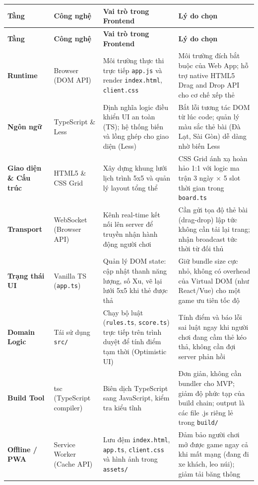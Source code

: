 \begin{longtable}{|p{2.5cm}|p{2.8cm}|p{4.5cm}|p{5.2cm}|}
\hline
\rowcolor[rgb]{0.8, 0.9, 1.0}
\textbf{Tầng} &
\textbf{Công nghệ} &
\textbf{Vai trò trong Frontend} &
\textbf{Lý do chọn}
\\
\hline
\endfirsthead

\hline
\rowcolor[rgb]{0.8, 0.9, 1.0}
\textbf{Tầng} &
\textbf{Công nghệ} &
\textbf{Vai trò trong Frontend} &
\textbf{Lý do chọn}
\\
\hline
\endhead

\textbf{Runtime}
&
Browser (DOM API)
&
Môi trường thực thi trực tiếp \texttt{app.js} và render \texttt{index.html}, \texttt{client.css}
&
Môi trường đích bắt buộc của Web App; hỗ trợ native HTML5 Drag and Drop API cho cơ chế xếp thẻ
\\
\hline

\textbf{Ngôn ngữ}
&
TypeScript \& Less
&
Định nghĩa logic điều khiển UI an toàn (TS); hệ thống biến và lồng ghép cho giao diện (Less)
&
Bắt lỗi tương tác DOM từ lúc code; quản lý màu sắc thẻ bài (Đà Lạt, Sài Gòn) dễ dàng nhờ biến Less
\\
\hline

\textbf{Giao diện \& Cấu trúc}
&
HTML5 \& CSS Grid
&
Xây dựng khung lưới lịch trình 5x5 và quản lý layout tổng thể
&
CSS Grid ánh xạ hoàn hảo 1:1 với logic ma trận 3 ngày $\times$ 5 slot thời gian trong \texttt{board.ts}
\\
\hline

\textbf{Transport}
&
WebSocket (Browser API)
&
Kênh real-time kết nối lên server để truyền nhận hành động người chơi
&
Cần gửi tọa độ thẻ bài (drag-drop) lập tức không cần tải lại trang; nhận broadcast tức thời từ đối thủ
\\
\hline

\textbf{Trạng thái UI}
&
Vanilla TS (\texttt{app.ts})
&
Quản lý DOM state: cập nhật thanh năng lượng, số Xu, vẽ lại lưới 5x5 khi thẻ được thả
&
Giữ bundle size cực nhỏ, không có overhead của Virtual DOM (như React/Vue) cho một game ưu tiên tốc độ
\\
\hline

\textbf{Domain Logic}
&
Tái sử dụng \texttt{src/}
&
Chạy bộ luật (\texttt{rules.ts}, \texttt{score.ts}) trực tiếp trên trình duyệt để tính điểm tạm thời (Optimistic UI)
&
Tính điểm và báo lỗi sai luật ngay khi người chơi đang cầm thẻ kéo thả, không cần đợi server phản hồi
\\
\hline

\textbf{Build Tool}
&
tsc (TypeScript compiler)
&
Biên dịch TypeScript sang JavaScript, kiểm tra kiểu tĩnh
&
Đơn giản, không cần bundler cho MVP; giảm độ phức tạp của build chain; output là các file .js riêng lẻ trong \texttt{build/} 
\\
\hline

\textbf{Offline / PWA}
&
Service Worker (Cache API)
&
Lưu đệm \texttt{index.html}, \texttt{app.ts}, \texttt{client.css} và hình ảnh trong \texttt{assets/}
&
Đảm bảo người chơi mở được game ngay cả khi mất mạng (đang đi xe khách, leo núi); giảm tải băng thông
\\
\hline

\end{longtable}

